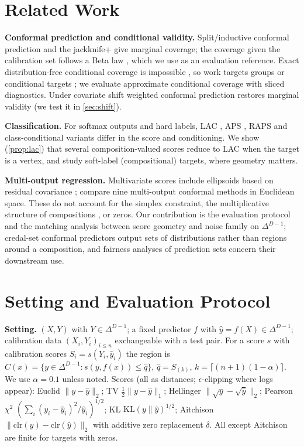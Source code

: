 \documentclass{article}
\theoremstyle{plain}
\theoremstyle{remark}
\newcommand{\simplex}{\Delta^{D-1}}
\newcommand{\yh}{\hat y}
\begin{document}
\section{Related Work}
\textbf{Conformal prediction and conditional validity.}
Split/inductive conformal prediction \citep{papadopoulos2002,vovk2005,lei2018} and the jackknife+ \citep{barber2021jackknife} give marginal coverage; the coverage given the calibration set follows a Beta law \citep{vovk2012}, which we use as an evaluation reference. Exact distribution-free conditional coverage is impossible \citep{barber2021limits}, so work targets groups or conditional targets \citep{vovk2012,ding2023,jung2023,gibbs2025}; we evaluate approximate conditional coverage with sliced diagnostics. Under covariate shift weighted conformal prediction \citep{tibshirani2019} restores marginal validity (we test it in \cref{sec:shift}).

\textbf{Classification.}
For softmax outputs and hard labels, LAC \citep{sadinle2019}, APS \citep{romano2020}, RAPS \citep{angelopoulos2021raps} and class-conditional variants \citep{ding2023} differ in the score and conditioning. We show (\cref{prop:lac}) that several composition-valued scores reduce to LAC when the target is a vertex, and study soft-label (compositional) targets, where geometry matters.

\textbf{Multi-output regression.}
Multivariate scores include ellipsoids based on residual covariance \citep{johnstone2022,xu2024}; \citet{dheur2025} compare nine multi-output conformal methods in Euclidean space. These do not account for the simplex constraint, the multiplicative structure of compositions \citep{aitchison1982,egozcue2003}, or zeros. Our contribution is the evaluation protocol and the matching analysis between score geometry and noise family on $\simplex$; credal-set conformal predictors \citep{javanmardi2024} output sets of distributions rather than regions around a composition, and fairness analyses of prediction sets \citep{cresswell2024} concern their downstream use.

\section{Setting and Evaluation Protocol}\label{sec:protocol}
\textbf{Setting.} $(X,Y)$ with $Y\in\simplex$; a fixed predictor $f$ with $\yh=f(X)\in\simplex$; calibration data $(X_i,Y_i)_{i\le n}$ exchangeable with a test pair. For a score $s$ with calibration scores $S_i=s(Y_i,\yh_i)$ the region is $C(x)=\{y\in\simplex:s(y,f(x))\le \hat q\}$, $\hat q=S_{(k)}$, $k=\lceil(n+1)(1-\alpha)\rceil$. We use $\alpha=0.1$ unless noted. Scores (all as distances; $\epsilon$-clipping where logs appear): Euclid $\|y-\yh\|_2$; TV $\tfrac12\|y-\yh\|_1$; Hellinger $\|\sqrt y-\sqrt{\yh}\|_2$; Pearson $\chi^2$ $(\sum_i (y_i-\yh_i)^2/\yh_i)^{1/2}$; KL $\mathrm{KL}(y\|\yh)^{1/2}$; Aitchison $\|\mathrm{clr}(y)-\mathrm{clr}(\yh)\|_2$ with additive zero replacement $\delta$.
All except Aitchison are finite for targets with zeros.
\end{document}
